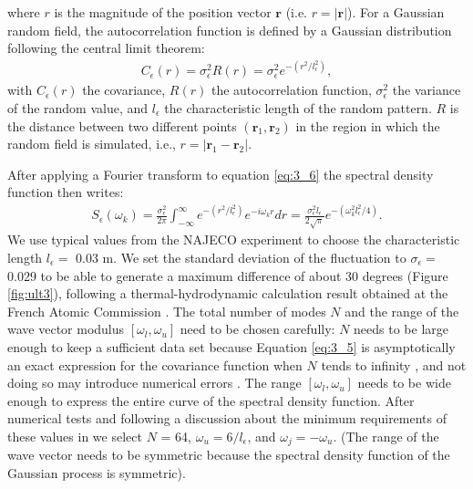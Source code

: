                 where $r$ is the magnitude of the position vector $\bm{r}$ (i.e. $r = |\bm{r}|$). For a Gaussian random field, the autocorrelation function is
defined by a Gaussian distribution following the central limit theorem:
                \begin{align}\label{eq:3_7}
                    C_{\epsilon}(r)=\sigma_{\epsilon}^2R(r)=\sigma_{\epsilon}^2e^{-(r^2/l_{\epsilon}^2)},
                \end{align}
                with $C_{\epsilon}(r)$ the covariance, $R(r)$ the autocorrelation function, $\sigma_{\epsilon}^2$ the variance of the random value, and
$l_{\epsilon}$ the characteristic length of the random pattern. $R$ is the distance between two different points $(\bm{r}_1,\bm{r}_2)$ in the region in which
the random field is simulated, i.e., $r=|\bm{r}_1-\bm{r}_2|$.

                After applying a Fourier transform to equation \ref{eq:3_6} the spectral density function then writes:
                \begin{align}\label{eq:3_8}
                    S_{\epsilon}(\omega_k)=\frac{\sigma_{\epsilon}^2}{2\pi}\int_{-\infty}^\infty e^{-(r^2/l_{\epsilon}^2)}
e^{-i\omega_kr}dr=\frac{\sigma_{\epsilon}^2l_{\epsilon} }{2\sqrt{\pi}}e^{-(\omega_k^2 l_{\epsilon}^2/4)}.
                \end{align}
                We use typical values from the NAJECO experiment \parencite{Tenchine2010Somethermalhydraulic} to choose the characteristic length $l_{\epsilon}
=$ 0.03 m. We set the standard deviation of the fluctuation to $\sigma_\epsilon =$ 0.029 to be able to generate a maximum difference of about 30 degrees
(Figure \ref{fig:ult3}), following a thermal-hydrodynamic calculation result obtained at the French Atomic Commission
\parencite{Tenchine2010Somethermalhydraulic}. The total number of modes $N$ and the range of the wave vector modulus $[\omega_l,\omega_u]$ need to be chosen
carefully: $N$ needs to be large enough to keep a sufficient data set because Equation \ref{eq:3_5} is asymptotically an exact expression for the covariance
function when $N$ tends to infinity \parencite{Shinozuka1972Digitalsimulationof}, and not doing so may introduce numerical errors
\parencite{Mantoglou1982TheTurningBands}. The range $[\omega_l,\omega_u]$ needs to be wide enough to express the entire curve of the spectral density function.
After numerical tests and following a discussion about the minimum requirements of these values in \textcite{Lee2009Effectsoftopography} we select $N$ = 64,
$\omega_u = 6/l_\epsilon$, and $\omega_j=-\omega_u$. (The range of the wave vector needs to be symmetric because the spectral density function of the Gaussian
process is symmetric).

